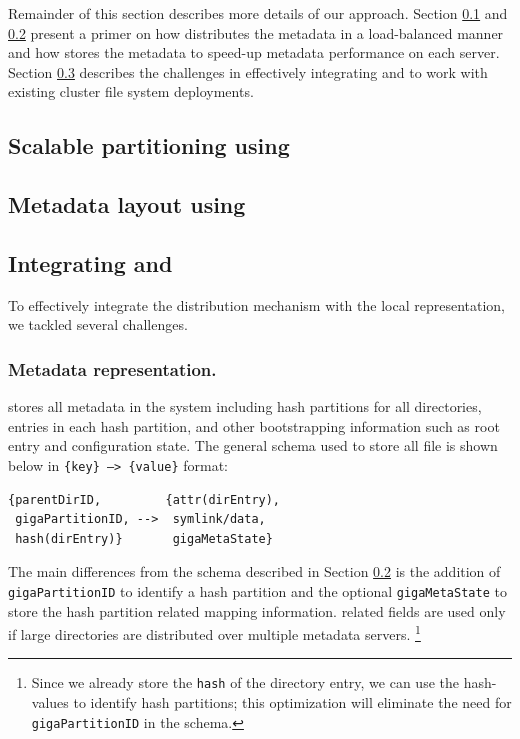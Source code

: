 Remainder of this section describes more details of our approach. 
Section \ref{design.giga} and \ref{design.tablefs} present a primer on how
\giga{} distributes the metadata in a load-balanced manner and how \tfs{}
stores the metadata to speed-up metadata performance on each server. 
Section \ref{design.integration} describes the challenges in effectively
integrating \giga{} and \tfs{} to work with existing cluster file system
deployments. 

\subsection{Scalable partitioning using \giga{}}
\label{design.giga}


\subsection{Metadata layout using \tfs{}}
\label{design.tablefs}


\subsection{Integrating \giga{} and \tfs{}}
\label{design.integration}

To effectively integrate the \giga{} distribution mechanism with the
\tfs{} local representation, we tackled several challenges. 

\subsubsection*{Metadata representation.}

\tfs{} stores all metadata in the system including \giga{} hash
partitions for all directories, entries in each hash partition, and other
bootstrapping information such as root entry and \giga{} configuration state.
The general schema used to store all file is shown below in
\texttt{\{key\} --> \{value\}} format:

\begin{verbatim}
{parentDirID,         {attr(dirEntry),
 gigaPartitionID, -->  symlink/data,
 hash(dirEntry)}       gigaMetaState}
\end{verbatim}

The main differences from the \tfs{} schema described in Section
\ref{design.tablefs} is the addition of \texttt{gigaPartitionID} to identify a
\giga{} hash partition and the optional \texttt{gigaMetaState} to store the
hash partition related mapping information. \giga{} related fields are used
only if large directories are distributed over multiple metadata servers.
\footnote{
Since we already store the \texttt{hash} of the directory entry, we can use the
hash-values to identify hash partitions; this optimization will eliminate the
need for \texttt{gigaPartitionID} in the schema.} 

